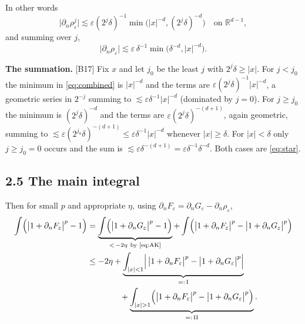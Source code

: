 \documentclass[11pt,reqno]{amsart}
\theoremstyle{plain}
\theoremstyle{definition}
\theoremstyle{plain}
\theoremstyle{definition}
\theoremstyle{remark}
\newcommand{\Rdm}{\mathbb{R}^{d-1}}
\newcommand{\nd}{\partial_n}
\newcommand{\Ledger}[1]{{\scriptsize\textsf{[#1]}}}
\begin{document}
In other words
\begin{equation}\label{eq:combined}
 \bigl|\nd\rho^j_\varepsilon\bigr|
  \lesssim\varepsilon(2^j\delta)^{-1}\min\!\bigl(|x|^{-d},(2^j\delta)^{-d}\bigr)
  \quad\text{on }\Rdm,
\end{equation}
and summing over $j$,
\begin{equation}\label{eq:star}\tag{$*$}
 \bigl|\nd\rho_\varepsilon\bigr|
  \lesssim\varepsilon\,\delta^{-1}\min\!\bigl(\delta^{-d},|x|^{-d}\bigr).
\end{equation}

\begin{expansion}
\textbf{The summation.} \Ledger{B17} Fix $x$ and let $j_0$ be the least $j$ with
$2^j\delta\ge|x|$. For $j<j_0$ the minimum in \eqref{eq:combined} is $|x|^{-d}$ and
the terms are $\varepsilon(2^j\delta)^{-1}|x|^{-d}$, a geometric series in $2^{-j}$
summing to $\lesssim\varepsilon\delta^{-1}|x|^{-d}$ (dominated by $j=0$). For
$j\ge j_0$ the minimum is $(2^j\delta)^{-d}$ and the terms are
$\varepsilon(2^j\delta)^{-(d+1)}$, again geometric, summing to
$\lesssim\varepsilon(2^{j_0}\delta)^{-(d+1)}\le\varepsilon\delta^{-1}|x|^{-d}$
whenever $|x|\ge\delta$. For $|x|<\delta$ only $j\ge j_0=0$ occurs and the sum is
$\lesssim\varepsilon\delta^{-(d+1)}=\varepsilon\delta^{-1}\delta^{-d}$. Both cases
are \eqref{eq:star}.
\end{expansion}

\subsection*{2.5 The main integral}

Then for small $p$ and appropriate $\eta$, using
$\nd F_\varepsilon=\nd G_\varepsilon-\nd\rho_\varepsilon$,
\begin{align}
 \int\Bigl(\bigl|1+\nd F_\varepsilon\bigr|^p-1\Bigr)
 &=\underbrace{\int\Bigl(\bigl|1+\nd G_\varepsilon\bigr|^p-1\Bigr)}_{<\,-2\eta
   \ \text{by \eqref{eq:AK}}}
  +\int\Bigl(\bigl|1+\nd F_\varepsilon\bigr|^p-\bigl|1+\nd G_\varepsilon\bigr|^p\Bigr)
  \notag\\
 &\le-2\eta
  +\underbrace{\int_{|x|<1}\Bigl|\,\bigl|1+\nd F_\varepsilon\bigr|^p
    -\bigl|1+\nd G_\varepsilon\bigr|^p\Bigr|}_{=:\,\mathrm{I}}\notag\\
 &\qquad\qquad
  +\underbrace{\int_{|x|>1}\Bigl(\bigl|1+\nd F_\varepsilon\bigr|^p
    -\bigl|1+\nd G_\varepsilon\bigr|^p\Bigr)}_{=:\,\mathrm{II}} .
  \label{eq:split}
\end{align}
\end{document}
